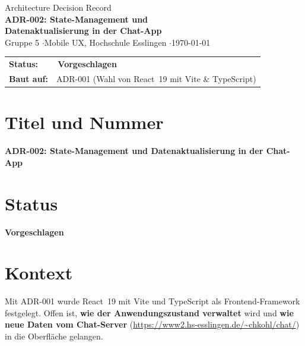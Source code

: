 \documentclass[a4paper,11pt]{article}
\begin{document}
\begin{tcolorbox}[colback=hsblue, colframe=hsblue, arc=2mm, left=6mm, right=6mm, top=5mm, bottom=5mm]
    \color{white}
    {\small Architecture Decision Record}\\[0.3em]
    {\LARGE\bfseries ADR-002: State-Management und\\[0.2em] Datenaktualisierung in der Chat-App}\\[0.8em]
    {\small Gruppe 5 \quad$\cdot$\quad Mobile UX, Hochschule Esslingen \quad$\cdot$\quad \today}
\end{tcolorbox}

\vspace{0.5em}
\begin{tabularx}{\textwidth}{@{}l X@{}}
    \textbf{Status:}  & \colorbox{hsblue}{\color{white}\bfseries\,Vorgeschlagen\,} \\[0.3em]
    \textbf{Baut auf:} & ADR-001 (Wahl von React~19 mit Vite \& TypeScript) \\
\end{tabularx}

\section{Titel und Nummer}
\textbf{ADR-002: State-Management und Datenaktualisierung in der Chat-App}

\section{Status}
\textbf{Vorgeschlagen}

\section{Kontext}
Mit ADR-001 wurde React~19 mit Vite und TypeScript als Frontend-Framework
festgelegt. Offen ist, \textbf{wie der Anwendungszustand verwaltet} wird und
\textbf{wie neue Daten vom Chat-Server}
(\url{https://www2.hs-esslingen.de/~chkohl/chat/}) in die Oberfläche gelangen.
\end{document}
